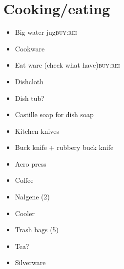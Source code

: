 \documentclass[11pt]{article}
\begin{document}
\section*{Cooking/eating}
\label{sec-3}
\begin{itemize}
\item Big water jug\hfill{}\textsc{buy:rei}
\label{sec-3-1}
\item Cookware
\label{sec-3-2}
\item Eat ware (check what have)\hfill{}\textsc{buy:rei}
\label{sec-3-3}
\item Dishcloth
\label{sec-3-4}
\item Dish tub?
\label{sec-3-5}
\item Castille soap for dish soap
\label{sec-3-6}
\item Kitchen knives
\label{sec-3-7}
\item Buck knife + rubbery buck knife
\label{sec-3-8}
\item Aero press
\label{sec-3-9}
\item Coffee
\label{sec-3-10}
\item Nalgene (2)
\label{sec-3-11}
\item Cooler
\label{sec-3-12}
\item Trash bags (5)
\label{sec-3-13}
\item Tea?
\label{sec-3-14}
\item Silverware
\label{sec-3-15}
\end{itemize}
\end{document}

